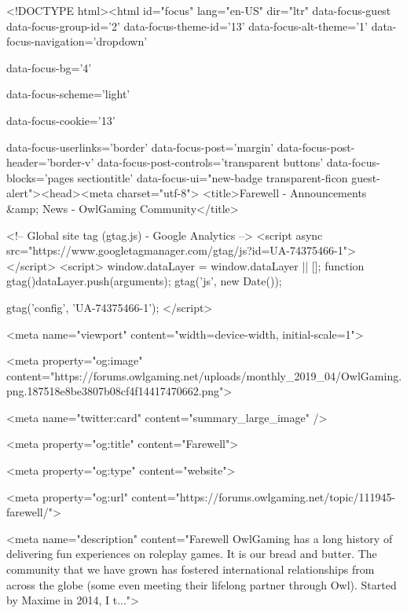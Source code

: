 <!DOCTYPE html><html id="focus" lang="en-US" dir="ltr" 
data-focus-guest
data-focus-group-id='2'
data-focus-theme-id='13'
data-focus-alt-theme='1'
data-focus-navigation='dropdown'

data-focus-bg='4'




data-focus-scheme='light'

data-focus-cookie='13'

data-focus-userlinks='border'
data-focus-post='margin'
data-focus-post-header='border-v'
data-focus-post-controls='transparent buttons'
data-focus-blocks='pages sectiontitle'
data-focus-ui="new-badge transparent-ficon guest-alert"><head><meta charset="utf-8">
<title>Farewell - Announcements &amp; News - OwlGaming Community</title>
		
			<!-- Global site tag (gtag.js) - Google Analytics -->
<script async src="https://www.googletagmanager.com/gtag/js?id=UA-74375466-1"></script>
<script>
  window.dataLayer = window.dataLayer || [];
  function gtag(){dataLayer.push(arguments);}
  gtag('js', new Date());

  gtag('config', 'UA-74375466-1');
</script>

		
		

	<meta name="viewport" content="width=device-width, initial-scale=1">


	
	
		<meta property="og:image" content="https://forums.owlgaming.net/uploads/monthly_2019_04/OwlGaming.png.187518e8be3807b08cf4f14417470662.png">
	


	<meta name="twitter:card" content="summary_large_image" />



	
		
			
				<meta property="og:title" content="Farewell">
			
		
	

	
		
			
				<meta property="og:type" content="website">
			
		
	

	
		
			
				<meta property="og:url" content="https://forums.owlgaming.net/topic/111945-farewell/">
			
		
	

	
		
			
				<meta name="description" content="Farewell OwlGaming has a long history of delivering fun experiences on roleplay games. It is our bread and butter. The community that we have grown has fostered international relationships from across the globe (some even meeting their lifelong partner through Owl). Started by Maxime in 2014, I t...">
			
